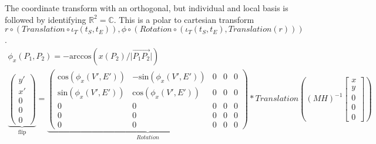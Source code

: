 \documentclass{report}
\begin{document}
The coordinate transform with an orthogonal, but individual and local basis is followed by identifying $\mathbb{R}^2=\mathbb{C}$. This is a polar to cartesian transform $r\circ (Translation\circ \iota_{T}(t_{S},t_{E})),\phi \circ (Rotation\circ (\iota_{T}(t_{S},t_{E}),Translation(r)))$.
\begin{align}
\phi_{x}(P_{1},P_{2}) = -\mathrm{arccos}(x(P_{2})/\lvert \overrightarrow{P_{1}P_{2}}\rvert)\\
\underbrace{
\begin{pmatrix}y' \\ x' \\ 0 \\ 0 \\ 0\end{pmatrix}
}_{\text{flip}}
=
\underbrace{
\begin{pmatrix}
\mathrm{cos}(\phi_{x}(V',E')) & -\mathrm{sin}(\phi_{x}(V',E')) & 0 & 0 & 0 \\
\mathrm{sin}(\phi_{x}(V',E')) & \mathrm{cos}(\phi_{x}(V',E')) & 0 & 0 & 0 \\
0 & 0 & 0 & 0 & 0 \\
0 & 0 & 0 & 0 & 0 \\
0 & 0 & 0 & 0 & 0
\end{pmatrix}
}_{Rotation}*
Translation((MH)^{-1}\begin{bmatrix} x \\ y \\ 0 \\ 0 \\ 0 \end{bmatrix})
\end{align}
\end{document}
